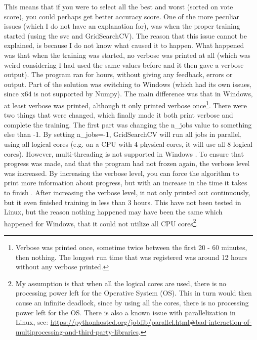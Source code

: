 This means that if you were to select all the best and worst (sorted on vote score), you could perhaps get better accuracy score.
\vspace{0.5em}\newline
One of the more peculiar issues (which I do not have an explanation for), was when the proper training started (using the \gls{svc} and GridSearchCV).
The reason that this issue cannot be explained, is because I do not know what caused it to happen.
What happened was that when the training was started, no verbose was printed at all (which was weird considering I had used the same values before and it then gave a verbose output). 
The program ran for hours, without giving any feedback, errors or output. 
\vspace{0.5em}\newline
Part of the solution was switching to Windows (which had its own issues, since x64 is not supported by Numpy).
The main difference was that in Windows, at least verbose was printed, although it only printed verbose once\footnote{
	Verbose was printed once, sometime twice between the first 20 - 60 minutes, then nothing.
	The longest run time that was registered was around 12 hours without any verbose printed.
}.
There were two things that were changed, which finally made it both print verbose and complete the training.
The first part was changing the n\_jobs value to something else than -1. 
By setting n\_jobs=-1, GridSearchCV will run all jobs in parallel, using all logical cores (e.g. on a CPU with 4 physical cores, it will use all 8 logical cores). 
However, multi-threading is not supported in Windows \cite{GS2015}. 
To ensure that progress was made, and that the program had not frozen again, the verbose level was increased.
By increasing the verbose level, you can force the algorithm to print more information about progress, but with an increase in the time it takes to finish \cite{Manuel2015, user29912432014}. 
After increasing the verbose level, it not only printed out continuously, but it even finished training in less than 3 hours.
This have not been tested in Linux, but the reason nothing happened may have been the same which happened for Windows, that it could not utilize all CPU cores\footnote{
	My assumption is that when all the logical cores are used, there is no processing power left for the Operative System (OS). 
	This in turn would then cause an infinite deadlock, since by using all the cores, there is no processing power left for the OS.
	There is also a known issue with parallelization in Linux, see: 
	\url{https://pythonhosted.org/joblib/parallel.html\#bad-interaction-of-multiprocessing-and-third-party-libraries}.
}.
